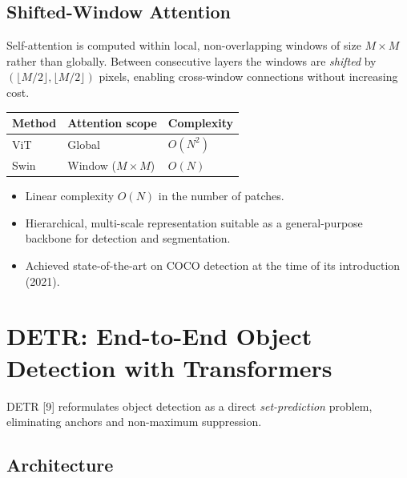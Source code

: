\documentclass[12pt,a4paper]{report}
\begin{document}
\subsection{Shifted-Window Attention}

Self-attention is computed within local, non-overlapping windows of size
$M\times M$ rather than globally.  Between consecutive layers the windows are
\emph{shifted} by $(\lfloor M/2\rfloor,\lfloor M/2\rfloor)$ pixels, enabling
cross-window connections without increasing cost.

\begin{formulabox}
\begin{center}
\begin{tabular}{lll}
\toprule
Method & Attention scope & Complexity \\
\midrule
ViT & Global & $O(N^2)$ \\
Swin & Window ($M\!\times\!M$) & $O(N)$ \\
\bottomrule
\end{tabular}
\end{center}
\end{formulabox}

\begin{importantbox}
\begin{itemize}[itemsep=1pt]
    \item Linear complexity $O(N)$ in the number of patches.
    \item Hierarchical, multi-scale representation suitable as a general-purpose
          backbone for detection and segmentation.
    \item Achieved state-of-the-art on COCO detection at the time of its
          introduction (2021).
\end{itemize}
\end{importantbox}

\section{DETR: End-to-End Object Detection with Transformers}

DETR [9] reformulates object detection as a direct
\emph{set-prediction} problem, eliminating anchors and non-maximum suppression.

\subsection{Architecture}
\end{document}
